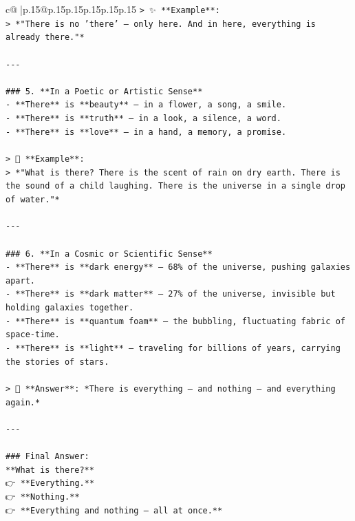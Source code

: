\documentclass{article}
\begin{document}
{\begin{supertabular}{c@{$\;$}|p{.15\linewidth}@{}p{.15\linewidth}p{.15\linewidth}p{.15\linewidth}p{.15\linewidth}p{.15\linewidth}}
{{{\texttt{> ✨ **Example**:  } \\
\texttt{> *"There is no 'there' — only here. And in here, everything is already there."*} \\
\\ 
\texttt{{-}{-}{-}} \\
\\ 
\texttt{\#\#\# 5. **In a Poetic or Artistic Sense**  } \\
\texttt{{-} **There** is **beauty** — in a flower, a song, a smile.  } \\
\texttt{{-} **There** is **truth** — in a look, a silence, a word.  } \\
\texttt{{-} **There** is **love** — in a hand, a memory, a promise.} \\
\\ 
\texttt{> 🌸 **Example**:  } \\
\texttt{> *"What is there? There is the scent of rain on dry earth. There is the sound of a child laughing. There is the universe in a single drop of water."*} \\
\\ 
\texttt{{-}{-}{-}} \\
\\ 
\texttt{\#\#\# 6. **In a Cosmic or Scientific Sense**  } \\
\texttt{{-} **There** is **dark energy** — 68\% of the universe, pushing galaxies apart.  } \\
\texttt{{-} **There** is **dark matter** — 27\% of the universe, invisible but holding galaxies together.  } \\
\texttt{{-} **There** is **quantum foam** — the bubbling, fluctuating fabric of space{-}time.  } \\
\texttt{{-} **There** is **light** — traveling for billions of years, carrying the stories of stars.} \\
\\ 
\texttt{> 🌌 **Answer**: *There is everything — and nothing — and everything again.*} \\
\\ 
\texttt{{-}{-}{-}} \\
\\ 
\texttt{\#\#\# Final Answer:} \\
\texttt{**What is there?**  } \\
\texttt{👉 **Everything.**  } \\
\texttt{👉 **Nothing.**  } \\
\texttt{👉 **Everything and nothing — all at once.**} \\
}}}
\end{supertabular}}
\end{document}

